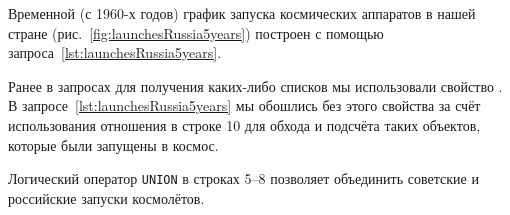 
Временной (с 1960-х годов) 
график запуска космических аппаратов в нашей стране (рис.~\ref{fig:launchesRussia5years}) 
построен с помощью запроса~\ref{lst:launchesRussia5years}.%

Ранее в запросах для получения каких-либо списков мы использовали свойство . 
В запросе~\ref{lst:launchesRussia5years} мы обошлись без этого свойства за счёт использования отношения 
 в строке 10 
для обхода и подсчёта таких объектов, которые были запущены в космос.  

Логический оператор \lstinline|UNION| в строках 5--8 
позволяет объединить советские и российские запуски космолётов. 

